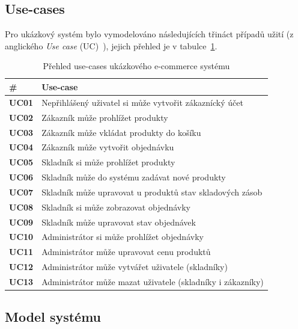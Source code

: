 \subsection{Use-cases}

Pro ukázkový systém bylo vymodelováno následujících třináct případů užití
(z anglického \textit{Use case} (UC)~\cite{bittner2002use}), jejich
přehled je v tabulce~\ref{tbl:use-cases}.

\begin{table}
    \centering
    \begin{tabular}{ l l }
        \hline
        \textbf{\#} & \textbf{Use-case} \\
        \hline \hline
        \textbf{UC01} & Nepřihlášený uživatel si může vytvořit zákaznícký účet \\
        \textbf{UC02} & Zákazník může prohlížet produkty \\
        \textbf{UC03} & Zákazník může vkládat produkty do košíku \\
        \textbf{UC04} & Zákazník může vytvořit objednávku \\
        \textbf{UC05} & Skladník si může prohlížet produkty \\
        \textbf{UC06} & Skladník může do systému zadávat nové produkty \\
        \textbf{UC07} & Skladník může upravovat u produktů stav skladových zásob \\
        \textbf{UC08} & Skladník si může zobrazovat objednávky \\
        \textbf{UC09} & Skladník může upravovat stav objednávek \\
        \textbf{UC10} & Administrátor si může prohlížet objednávky \\
        \textbf{UC11} & Administrátor může upravovat cenu produktů \\
        \textbf{UC12} & Administrátor může vytvářet uživatele (skladníky) \\
        \textbf{UC13} & Administrátor může mazat uživatele (skladníky i zákazníky) \\
        \hline
    \end{tabular}
    \caption{Přehled use-cases ukázkového e-commerce systému}
    \label{tbl:use-cases}
\end{table}

\subsection{Model systému}

